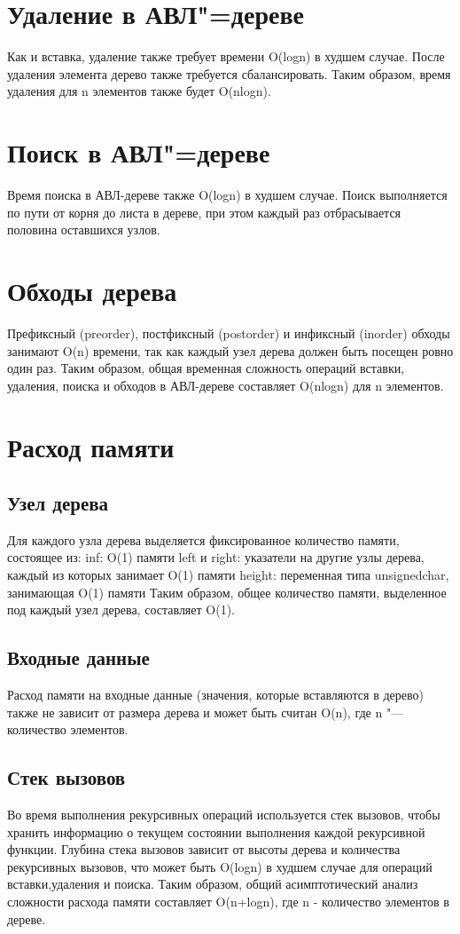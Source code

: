\documentclass[otchet]{SCWorks}
\begin{document}
\section{Удаление в АВЛ"=дереве}
Как и вставка, удаление также требует времени O(logn) в худшем случае. После удаления элемента дерево также требуется сбалансировать.
Таким образом, время удаления для n элементов также будет O(nlogn).

\section{Поиск в АВЛ"=дереве}
Время поиска в АВЛ-дереве также O(logn) в худшем случае. 
Поиск выполняется по пути от корня до листа в дереве, при этом каждый раз отбрасывается половина оставшихся узлов.

\section{Обходы дерева}
Префиксный (preorder), постфиксный (postorder) и инфиксный (inorder) обходы занимают O(n) времени, так как каждый узел дерева должен быть посещен ровно один раз.
Таким образом, общая временная сложность операций вставки, удаления, поиска и обходов в АВЛ-дереве составляет O(nlogn) для n элементов.


\section{Расход памяти}
\subsection*{Узел дерева}

Для каждого узла дерева выделяется фиксированное количество памяти, состоящее из:
inf: O(1) памяти
left и right: указатели на другие узлы дерева, каждый из которых занимает O(1) памяти
height: переменная типа unsignedchar, занимающая O(1) памяти
Таким образом, общее количество памяти, выделенное под каждый узел дерева, составляет O(1).

\subsection*{Входные данные}
Расход памяти на входные данные (значения, которые вставляются в дерево) также не зависит от размера дерева и может быть считан O(n), где n "--- количество элементов.

\subsection*{Стек вызовов}
Во время выполнения рекурсивных операций используется стек вызовов, чтобы хранить информацию о текущем состоянии выполнения каждой рекурсивной функции. Глубина стека вызовов зависит от высоты дерева и количества рекурсивных вызовов, что может быть O(logn) в худшем случае для операций вставки,удаления и поиска.
Таким образом, общий асимптотический анализ сложности расхода памяти составляет O(n+logn), где n - количество элементов в дереве.
\end{document}
